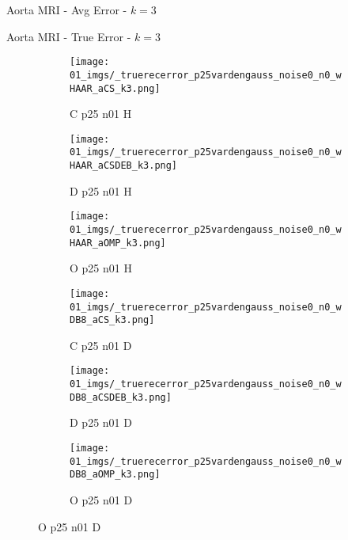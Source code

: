 \begin{frame}{Aorta MRI - Avg Error - $k=3$}{}
\begin{figure}
\end{figure}
\end{frame}


\begin{frame}{Aorta MRI - True Error - $k=3$}{}
\begin{figure}
\begin{subfigure}{0.13\textwidth}
\texttt{[image: 01\_imgs/\_truerecerror\_p25vardengauss\_noise0\_n0\_wHAAR\_aCS\_k3.png]}
\caption*{\tiny C p25 n01 H}
\end{subfigure}
\begin{subfigure}{0.13\textwidth}
\texttt{[image: 01\_imgs/\_truerecerror\_p25vardengauss\_noise0\_n0\_wHAAR\_aCSDEB\_k3.png]}
\caption*{\tiny D p25 n01 H}
\end{subfigure}
\begin{subfigure}{0.13\textwidth}
\texttt{[image: 01\_imgs/\_truerecerror\_p25vardengauss\_noise0\_n0\_wHAAR\_aOMP\_k3.png]}
\caption*{\tiny O p25 n01 H}
\end{subfigure}
\begin{subfigure}{0.13\textwidth}
\texttt{[image: 01\_imgs/\_truerecerror\_p25vardengauss\_noise0\_n0\_wDB8\_aCS\_k3.png]}
\caption*{\tiny C p25 n01 D}
\end{subfigure}
\begin{subfigure}{0.13\textwidth}
\texttt{[image: 01\_imgs/\_truerecerror\_p25vardengauss\_noise0\_n0\_wDB8\_aCSDEB\_k3.png]}
\caption*{\tiny D p25 n01 D}
\end{subfigure}
\begin{subfigure}{0.13\textwidth}
\texttt{[image: 01\_imgs/\_truerecerror\_p25vardengauss\_noise0\_n0\_wDB8\_aOMP\_k3.png]}
\caption*{\tiny O p25 n01 D}
\end{subfigure}

\vspace{5pt}


\end{figure}
\end{frame}
